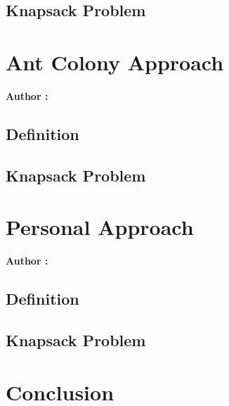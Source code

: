 \documentclass[12pt]{article}
\begin{document}
    \subsection{Knapsack Problem}

\section{Ant Colony Approach}

    \textbf{Author :}

    \subsection{Definition}
    
    \subsection{Knapsack Problem}

\section{Personal Approach}

    \textbf{Author :}

    \subsection{Definition}
    
    \subsection{Knapsack Problem}

\section{Conclusion}
\end{document}
